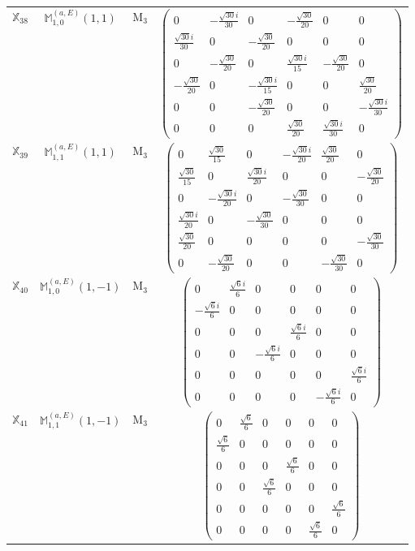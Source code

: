 \documentclass[fleqn,10pt,landscape]{article}
\begin{document}
\begin{itemize}
\begin{center}
\begin{longtable}{c|c|c|c}
$ \mathbb{X}_{38} $ & $\mathbb{M}_{1,0}^{(a,E)}(1,1)$ & M$_{3}$ & $\begin{pmatrix} 0 & - \frac{\sqrt{30} i}{30} & 0 & - \frac{\sqrt{30}}{20} & 0 & 0 \\ \frac{\sqrt{30} i}{30} & 0 & - \frac{\sqrt{30}}{20} & 0 & 0 & 0 \\ 0 & - \frac{\sqrt{30}}{20} & 0 & \frac{\sqrt{30} i}{15} & - \frac{\sqrt{30}}{20} & 0 \\ - \frac{\sqrt{30}}{20} & 0 & - \frac{\sqrt{30} i}{15} & 0 & 0 & \frac{\sqrt{30}}{20} \\ 0 & 0 & - \frac{\sqrt{30}}{20} & 0 & 0 & - \frac{\sqrt{30} i}{30} \\ 0 & 0 & 0 & \frac{\sqrt{30}}{20} & \frac{\sqrt{30} i}{30} & 0 \end{pmatrix}$ \\
$ \mathbb{X}_{39} $ & $\mathbb{M}_{1,1}^{(a,E)}(1,1)$ & M$_{3}$ & $\begin{pmatrix} 0 & \frac{\sqrt{30}}{15} & 0 & - \frac{\sqrt{30} i}{20} & \frac{\sqrt{30}}{20} & 0 \\ \frac{\sqrt{30}}{15} & 0 & \frac{\sqrt{30} i}{20} & 0 & 0 & - \frac{\sqrt{30}}{20} \\ 0 & - \frac{\sqrt{30} i}{20} & 0 & - \frac{\sqrt{30}}{30} & 0 & 0 \\ \frac{\sqrt{30} i}{20} & 0 & - \frac{\sqrt{30}}{30} & 0 & 0 & 0 \\ \frac{\sqrt{30}}{20} & 0 & 0 & 0 & 0 & - \frac{\sqrt{30}}{30} \\ 0 & - \frac{\sqrt{30}}{20} & 0 & 0 & - \frac{\sqrt{30}}{30} & 0 \end{pmatrix}$ \\
$ \mathbb{X}_{40} $ & $\mathbb{M}_{1,0}^{(a,E)}(1,-1)$ & M$_{3}$ & $\begin{pmatrix} 0 & \frac{\sqrt{6} i}{6} & 0 & 0 & 0 & 0 \\ - \frac{\sqrt{6} i}{6} & 0 & 0 & 0 & 0 & 0 \\ 0 & 0 & 0 & \frac{\sqrt{6} i}{6} & 0 & 0 \\ 0 & 0 & - \frac{\sqrt{6} i}{6} & 0 & 0 & 0 \\ 0 & 0 & 0 & 0 & 0 & \frac{\sqrt{6} i}{6} \\ 0 & 0 & 0 & 0 & - \frac{\sqrt{6} i}{6} & 0 \end{pmatrix}$ \\
$ \mathbb{X}_{41} $ & $\mathbb{M}_{1,1}^{(a,E)}(1,-1)$ & M$_{3}$ & $\begin{pmatrix} 0 & \frac{\sqrt{6}}{6} & 0 & 0 & 0 & 0 \\ \frac{\sqrt{6}}{6} & 0 & 0 & 0 & 0 & 0 \\ 0 & 0 & 0 & \frac{\sqrt{6}}{6} & 0 & 0 \\ 0 & 0 & \frac{\sqrt{6}}{6} & 0 & 0 & 0 \\ 0 & 0 & 0 & 0 & 0 & \frac{\sqrt{6}}{6} \\ 0 & 0 & 0 & 0 & \frac{\sqrt{6}}{6} & 0 \end{pmatrix}$ \\

\end{longtable}
\end{center}
\end{itemize}
\end{document}
